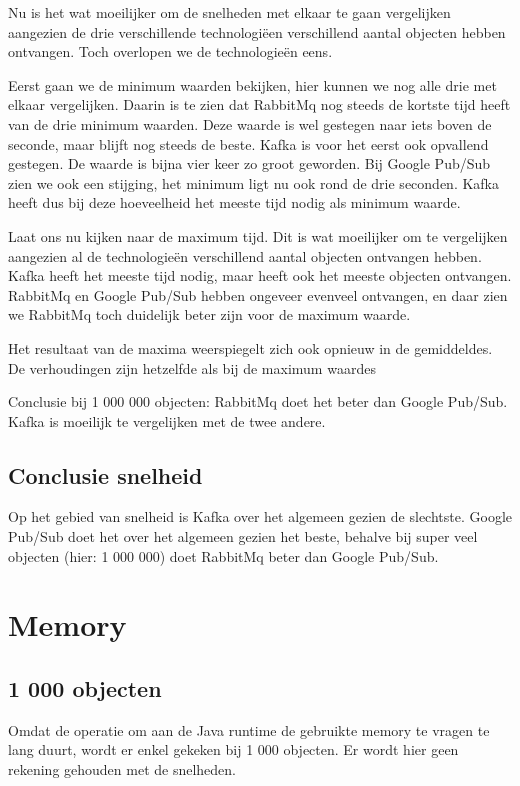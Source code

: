 Nu is het wat moeilijker om de snelheden met elkaar te gaan vergelijken aangezien de drie verschillende technologiëen verschillend aantal objecten hebben ontvangen. Toch overlopen we de technologieën eens.

Eerst gaan we de minimum waarden bekijken, hier kunnen we nog alle drie met elkaar vergelijken. Daarin is te zien dat RabbitMq nog steeds de kortste tijd heeft van de drie minimum waarden. Deze waarde is wel gestegen naar iets boven de seconde, maar blijft nog steeds de beste. Kafka is voor het eerst ook opvallend gestegen. De waarde is bijna vier keer zo groot geworden. Bij Google Pub/Sub zien we ook een stijging, het minimum ligt nu ook rond de drie seconden. Kafka heeft dus bij deze hoeveelheid het meeste tijd nodig als minimum waarde. 

Laat ons nu kijken naar de maximum tijd. Dit is wat moeilijker om te vergelijken aangezien al de technologieën verschillend aantal objecten ontvangen hebben. Kafka heeft het meeste tijd nodig, maar heeft ook het meeste objecten ontvangen. RabbitMq en Google Pub/Sub hebben ongeveer evenveel ontvangen, en daar zien we RabbitMq toch duidelijk beter zijn voor de maximum waarde.

Het resultaat van de maxima weerspiegelt zich ook opnieuw in de gemiddeldes. De verhoudingen zijn hetzelfde als bij de maximum waardes

Conclusie bij 1 000 000 objecten: RabbitMq doet het beter dan Google Pub/Sub. Kafka is moeilijk te vergelijken met de twee andere.

\subsection{Conclusie snelheid}
Op het gebied van snelheid is Kafka over het algemeen gezien de slechtste. Google Pub/Sub doet het over het algemeen gezien het beste, behalve bij super veel objecten (hier: 1 000 000) doet RabbitMq beter dan Google Pub/Sub.

\section{Memory}
\subsection{1 000 objecten}
Omdat de operatie om aan de Java runtime de gebruikte memory te vragen te lang duurt, wordt er enkel gekeken bij 1 000 objecten. Er wordt hier geen rekening gehouden met de snelheden.
